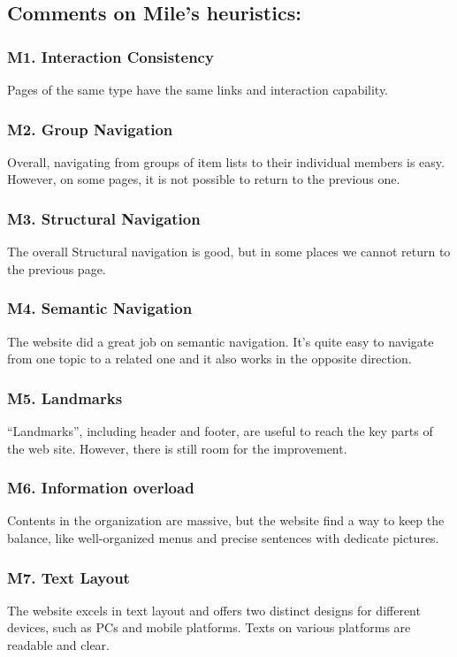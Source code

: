 \subsection{Comments on Mile’s heuristics:}

\subsubsection*{M1. Interaction Consistency}
Pages of the same type have the same links and interaction capability.

\subsubsection*{M2. Group Navigation}
Overall, navigating from groups of item lists to their individual members is easy. However, on some pages, it is not possible to return to the previous one.

\subsubsection*{M3. Structural Navigation}
The overall Structural navigation is good, but in some places we cannot return to the previous page.

\subsubsection*{M4. Semantic Navigation}
The website did a great job on semantic navigation. It's quite easy to navigate from one topic to a related one and it also works in the opposite direction.

\subsubsection*{M5. Landmarks}
“Landmarks”, including header and footer, are useful to reach the key parts of the web site. However, there is still room for the improvement.

\subsubsection*{M6. Information overload}
 Contents in the organization are massive, but the website find a way to keep the balance, like well-organized menus and precise sentences with dedicate pictures.

\subsubsection*{M7. Text Layout}
The website excels in text layout and offers two distinct designs for different devices, such as PCs and mobile platforms. Texts on various platforms are readable and clear.

